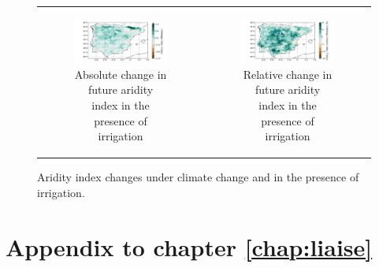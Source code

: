 \begin{figure}[htbp]
\begin{tabular}{cc}
        \begin{subfigure}[b]{0.5\textwidth}
            \caption{Absolute change in future aridity index in the presence of irrigation}
            \includegraphics[width=\textwidth]{images/chap4/future/diffmap_aridity_index_futirr.png}
        \end{subfigure} &
        \begin{subfigure}[b]{0.5\textwidth}
            \caption{Relative change in future aridity index in the presence of irrigation}
            \includegraphics[width=\textwidth]{images/chap4/future/reldiffmap_aridity_index_futirr.png}
        \end{subfigure} \\
    \end{tabular}
    \caption{Aridity index changes under climate change and in the presence of irrigation.}
    \label{fig:diffmaps_aridity}
\end{figure}

\clearpage

\section*{Appendix to chapter \ref{chap:liaise}}

